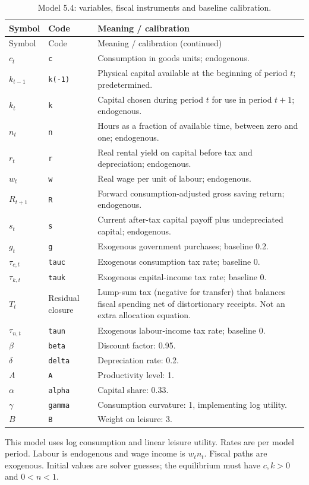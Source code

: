\documentclass[12pt]{article}
\begin{document}
\begingroup
\small
\captionsetup{labelformat=empty}
\begin{longtable}{p{}p{}p{}}
\caption{Model 5.4: variables, fiscal instruments and baseline calibration.}\\
\hline
Symbol & Code & Meaning / calibration \\
\hline
\endfirsthead
Symbol & Code & Meaning / calibration (continued) \\
\hline
\endhead
$c_t$ & \texttt{c} & Consumption in goods units; endogenous. \\
$k_{t-1}$ & \texttt{k(-1)} & Physical capital available at the beginning of period $t$; predetermined. \\
$k_t$ & \texttt{k} & Capital chosen during period $t$ for use in period $t+1$; endogenous. \\
$n_t$ & \texttt{n} & Hours as a fraction of available time, between zero and one; endogenous. \\
$r_t$ & \texttt{r} & Real rental yield on capital before tax and depreciation; endogenous. \\
$w_t$ & \texttt{w} & Real wage per unit of labour; endogenous. \\
$R_{t+1}$ & \texttt{R} & Forward consumption-adjusted gross saving return; endogenous. \\
$s_t$ & \texttt{s} & Current after-tax capital payoff plus undepreciated capital; endogenous. \\
$g_t$ & \texttt{g} & Exogenous government purchases; baseline 0.2. \\
$\tau_{c,t}$ & \texttt{tauc} & Exogenous consumption tax rate; baseline 0. \\
$\tau_{k,t}$ & \texttt{tauk} & Exogenous capital-income tax rate; baseline 0. \\
$T_t$ & Residual closure & Lump-sum tax (negative for transfer) that balances fiscal spending net of distortionary receipts. Not an extra allocation equation. \\
$\tau_{n,t}$ & \texttt{taun} & Exogenous labour-income tax rate; baseline 0. \\
$\beta$ & \texttt{beta} & Discount factor: 0.95. \\
$\delta$ & \texttt{delta} & Depreciation rate: 0.2. \\
$A$ & \texttt{A} & Productivity level: 1. \\
$\alpha$ & \texttt{alpha} & Capital share: 0.33. \\
$\gamma$ & \texttt{gamma} & Consumption curvature: 1, implementing log utility. \\
$B$ & \texttt{B} & Weight on leisure: 3. \\
\hline
\end{longtable}
\noindent This model uses log consumption and linear leisure utility. Rates are per model period. Labour is endogenous and wage income is $w_t n_t$. Fiscal paths are exogenous. Initial values are solver guesses; the equilibrium must have $c,k>0$ and $0<n<1$.
\endgroup
\end{document}
